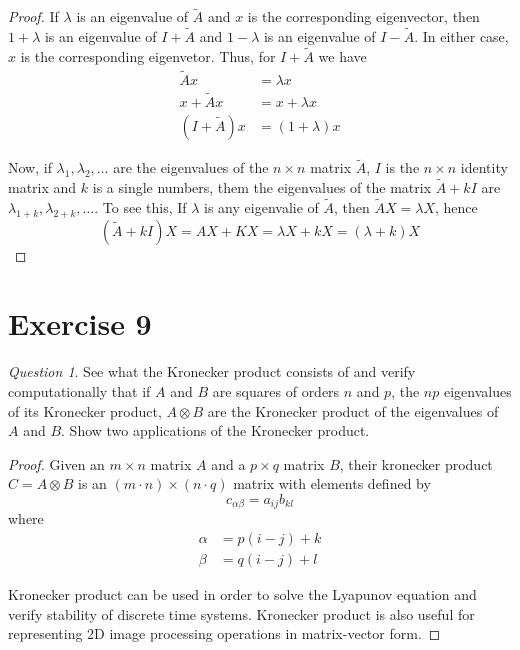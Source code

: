 \documentclass[11pt]{article}
\theoremstyle{definition}
\theoremstyle{remark}
\theoremstyle{remark}
\theoremstyle{remark}
\newtheorem*{question}{Question}
\theoremstyle{proof}
\begin{document}
\begin{proof}
  If $\lambda$ is an eigenvalue of $\widetilde{A}$ and $x$ is the corresponding
  eigenvector, then $1 + \lambda$ is an eigenvalue of $I + \widetilde{A}$ and
  $1 - \lambda$ is an eigenvalue of $I - \widetilde{A}$. In either case, $x$ is
  the corresponding eigenvetor. Thus, for $I + \widetilde{A}$ we have
  \begin{align*}
    \widetilde{A}x &= \lambda x \\
    x + \widetilde{A}x &= x + \lambda x \\
    (I + \widetilde{A})x &= (1 + \lambda)x
  \end{align*}

  Now, if $\lambda_{1},\lambda_{2}, \ldots$ are the eigenvalues of the
  $n \times n$ matrix $\widetilde{A}$, $I$ is the $n \times n$ identity matrix
  and $k$ is a single numbers, them the eigenvalues of the matrix
  $\widetilde{A} + kI$ are $\lambda_{1 + k}, \lambda_{2 + k}, \ldots$. To see
  this, If $\lambda$ is any eigenvalie of $\widetilde{A}$, then
  $\widetilde{A}X = \lambda X$, hence
  \[
    (\widetilde{A} +kI)X = AX + KX = \lambda X + kX = (\lambda + k) X
  \]
\end{proof}

\section*{Exercise 9}
\begin{question}
  See what the Kronecker product consists of and verify computationally that if
  $A$ and $B$ are squares of orders $n$ and $p$, the $np$ eigenvalues of its
  Kronecker product, $A \otimes B$ are the Kronecker product of the eigenvalues
  of $A$ and $B$. Show two applications of the Kronecker product.
\end{question}

\begin{proof}
  Given an $m \times n$ matrix $A$ and a $p \times q$ matrix $B$, their
  kronecker product $C = A \otimes B$ is an $(m \cdot n) \times (n \cdot q)$
  matrix with elements defined by
  \[
    c_{\alpha \beta} = a_{ij}b_{kl}
  \]
  where
  \begin{align*}
    \alpha &= p(i-j)+k \\
    \beta &= q(i-j) + l
  \end{align*}

  Kronecker product can be used in order to solve the Lyapunov equation and
  verify stability of discrete time systems. Kronecker product is also useful
  for representing 2D image processing operations in matrix-vector form.
\end{proof}
\end{document}
